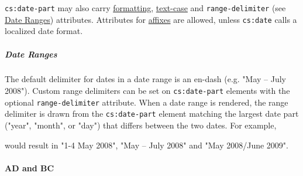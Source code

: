 \texttt{cs:date-part} may also carry
\protect\hyperlink{formatting}{formatting},
\protect\hyperlink{text-case}{text-case} and \texttt{range-delimiter}
(see \protect\hyperlink{date-ranges}{Date Ranges}) attributes.
Attributes for \protect\hyperlink{affixes}{affixes} are allowed, unless
\texttt{cs:date} calls a localized date format.

\hypertarget{date-ranges}{%
\subparagraph{Date Ranges}\label{date-ranges}}

The default delimiter for dates in a date range is an en-dash (e.g. "May
-- July 2008"). Custom range delimiters can be set on
\texttt{cs:date-part} elements with the optional
\texttt{range-delimiter} attribute. When a date range is rendered, the
range delimiter is drawn from the \texttt{cs:date-part} element matching
the largest date part ("year", "month", or "day") that differs between
the two dates. For example,

\begin{Shaded}
\begin{Highlighting}[]
\NormalTok{\textless{}}\NormalTok{\textgreater{}}
\NormalTok{  \textless{}}\NormalTok{\textgreater{}}
\NormalTok{    \textless{}}\NormalTok{\textgreater{}}
\NormalTok{      \textless{}}\NormalTok{\textgreater{}}
\NormalTok{        \textless{}}\NormalTok{/\textgreater{}}
\NormalTok{        \textless{}}\NormalTok{/\textgreater{}}
\NormalTok{        \textless{}}\NormalTok{/\textgreater{}}
\NormalTok{      \textless{}/}\NormalTok{\textgreater{}}
\NormalTok{    \textless{}/}\NormalTok{\textgreater{}}
\NormalTok{  \textless{}/}\NormalTok{\textgreater{}}
\NormalTok{\textless{}/}\NormalTok{\textgreater{}}
\end{Highlighting}
\end{Shaded}

would result in "1-4 May 2008", "May -- July 2008" and "May 2008/June
2009".

\hypertarget{ad-and-bc}{%
\paragraph{AD and BC}\label{ad-and-bc}}

